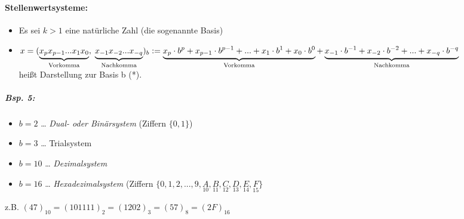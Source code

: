 \paragraph{Stellenwertsysteme:} \label{Stellenwertsysteme}
\begin{itemize}
\item Es sei $k>1$ eine natürliche Zahl (die sogenannte Basis)
\item $x = (\underbrace{x_p x_{p-1}...x_1x_0}_{\text{Vorkomma}},\;\underbrace{x_{-1}x_{-2}...x_{-q}}_{\text{Nachkomma}})_b\\
:= \underbrace{x_p\cdot b^p+x_{p-1}\cdot b^{p-1}+...+x_1\cdot b^1+x_0\cdot b^0}_{\text{Vorkomma}}+\underbrace{x_{-1}\cdot b^{-1}+x_{-2}\cdot b^{-2}+...+x_{-q}\cdot b^{-q}}_{\text{Nachkomma}}$\\
heißt Darstellung zur Basis b (*).
\end{itemize}

\subparagraph{Bsp. 5:}
\begin{itemize}
\item $b=2$ … \emph{Dual- oder Binärsystem} (Ziffern $\{0,1\}$)
\item $b=3$ … Trialsystem
\item $b=10$ … \emph{Dezimalsystem}
\item $b=16$ … \emph{Hexadezimalsystem} (Ziffern $\{0,1,2,...,9,\underset{10}{A},\underset{11}{B},\underset{12}{C},\underset{13}{D},\underset{14}{E},\underset{15}{F}\}$
\end{itemize}
z.B. $(47)_{10}=(101111)_2=(1202)_3=(57)_8=(2F)_{16}$
